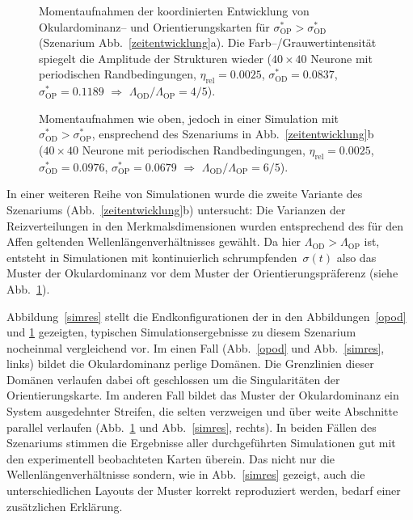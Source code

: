 \begin{figure}[p]
    \centering
    \begin{sideways}
    \end{sideways}
    \caption{Momentaufnahmen der koordinierten Entwicklung von Okular\-do\-minanz--
    und Orientierungskarten für
        $\sigma^\ast_{\text{OP}}>\sigma^\ast_{\text{OD}}$ (Szenarium
        Abb.~\ref{zeitentwicklung}a). Die Farb--/Grauwertintensität spiegelt
        die Amplitude der Strukturen wieder ($40\times 40$ Neurone mit periodischen
        Randbedingungen, $\eta_{\text{rel}}=0.0025$,
        $\sigma^\ast_{\text{OD}}=0.0837$, $\sigma^\ast_{\text{OP}}=0.1189$
        $\Longrightarrow$ $\Lambda_{\text{OD}}/\Lambda_{\text{OP}}=4/5$).}
    \label{opod}

    \begin{center}
        \begin{sideways}
        \end{sideways}
    \end{center}
    \caption{Momentaufnahmen wie oben, jedoch in einer Simulation mit
        $\sigma^\ast_{\text{OD}}>\sigma^\ast_{\text{OP}}$, ensprechend des Szenariums in
        Abb.~\ref{zeitentwicklung}b ($40\times 40$ Neurone mit
        periodischen Randbedingungen, $\eta_{\text{rel}}= 0.0025$,
        $\sigma^\ast_{\text{OD}}=0.0976$, $\sigma^\ast_{\text{OP}}=0.0679$
        $\Longrightarrow$ $\Lambda_{\text{OD}}/\Lambda_{\text{OP}}=6/5$).}
    \label{odop}
\end{figure}

In einer weiteren Reihe von Simulationen wurde die zweite Variante des
Szenariums (Abb.~\ref{zeitentwicklung}b) untersucht: Die Varianzen der
Reizverteilungen in den Merkmalsdimensionen wurden entsprechend des für
den Affen geltenden Wellen\-längen\-ver\-hältnisses gewählt. Da hier
$\Lambda_{\text{OD}} > \Lambda_{\text{OP}}$ ist, entsteht in Simulationen
mit kontinuierlich schrumpfenden~$\sigma(t)$ also das Muster der
Okulardominanz vor dem Muster der Orientierungspräferenz (siehe
Abb.~\ref{odop}).

Abbildung~\ref{simres} stellt die Endkonfigurationen der in den
Abbildungen~\ref{opod} und \ref{odop} gezeigten, typischen
Simulationsergebnisse zu diesem Szenarium nocheinmal vergleichend vor. Im
einen Fall (Abb.~\ref{opod} und Abb.~\ref{simres}, links) bildet die
Okulardominanz perlige Domänen. Die Grenzlinien dieser Domänen verlaufen
dabei oft geschlossen um die Singularitäten der Orientierungskarte. Im
anderen Fall bildet das Muster der Okulardominanz ein System ausgedehnter
Streifen, die selten verzweigen und über weite Abschnitte parallel
verlaufen (Abb.~\ref{odop} und Abb.~\ref{simres}, rechts).
In beiden Fällen des Szenariums stimmen die Ergebnisse aller durchgeführten
Simulationen gut mit den experimentell beobachteten Karten überein. Das
nicht nur die Wellenlängenverhältnisse sondern, wie in Abb.~\ref{simres}
gezeigt, auch die unterschiedlichen Layouts der Muster korrekt reproduziert
werden, bedarf einer zusätzlichen Erklärung.

